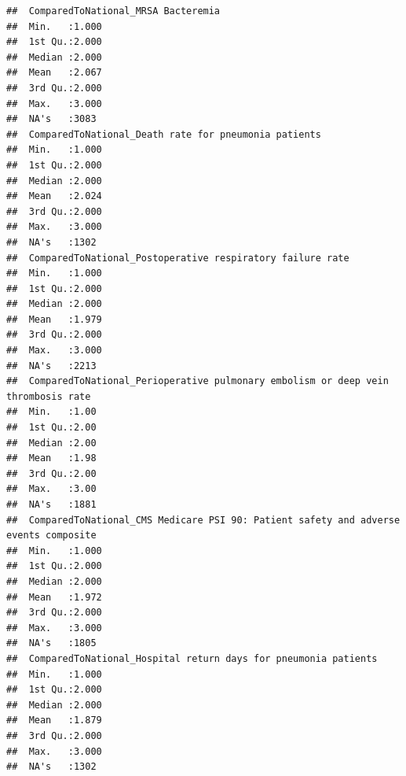 \documentclass[
]{article}
\begin{document}
\begin{verbatim}
##  ComparedToNational_MRSA Bacteremia
##  Min.   :1.000                     
##  1st Qu.:2.000                     
##  Median :2.000                     
##  Mean   :2.067                     
##  3rd Qu.:2.000                     
##  Max.   :3.000                     
##  NA's   :3083                      
##  ComparedToNational_Death rate for pneumonia patients
##  Min.   :1.000                                       
##  1st Qu.:2.000                                       
##  Median :2.000                                       
##  Mean   :2.024                                       
##  3rd Qu.:2.000                                       
##  Max.   :3.000                                       
##  NA's   :1302                                        
##  ComparedToNational_Postoperative respiratory failure rate
##  Min.   :1.000                                            
##  1st Qu.:2.000                                            
##  Median :2.000                                            
##  Mean   :1.979                                            
##  3rd Qu.:2.000                                            
##  Max.   :3.000                                            
##  NA's   :2213                                             
##  ComparedToNational_Perioperative pulmonary embolism or deep vein thrombosis rate
##  Min.   :1.00                                                                    
##  1st Qu.:2.00                                                                    
##  Median :2.00                                                                    
##  Mean   :1.98                                                                    
##  3rd Qu.:2.00                                                                    
##  Max.   :3.00                                                                    
##  NA's   :1881                                                                    
##  ComparedToNational_CMS Medicare PSI 90: Patient safety and adverse events composite
##  Min.   :1.000                                                                      
##  1st Qu.:2.000                                                                      
##  Median :2.000                                                                      
##  Mean   :1.972                                                                      
##  3rd Qu.:2.000                                                                      
##  Max.   :3.000                                                                      
##  NA's   :1805                                                                       
##  ComparedToNational_Hospital return days for pneumonia patients
##  Min.   :1.000                                                 
##  1st Qu.:2.000                                                 
##  Median :2.000                                                 
##  Mean   :1.879                                                 
##  3rd Qu.:2.000                                                 
##  Max.   :3.000                                                 
##  NA's   :1302
\end{verbatim}
\end{document}
